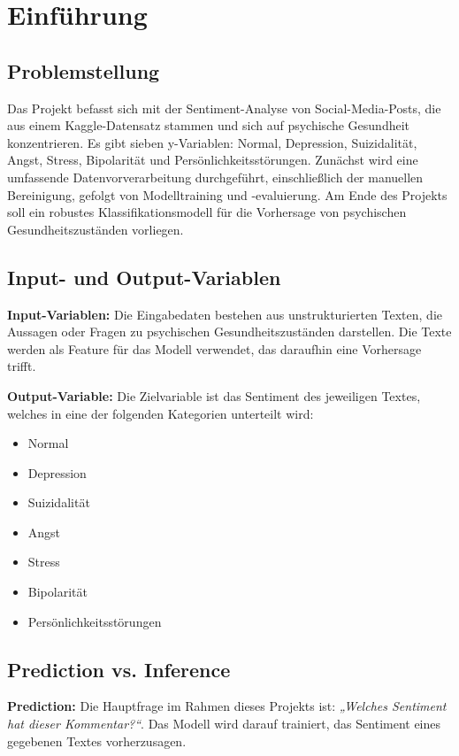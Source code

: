 \section{Einführung}

\subsection{Problemstellung}
Das Projekt befasst sich mit der Sentiment-Analyse von Social-Media-Posts, die aus einem Kaggle-Datensatz stammen und sich auf psychische Gesundheit konzentrieren. Es gibt sieben y-Variablen: Normal, Depression, Suizidalität, Angst, Stress, Bipolarität und Persönlichkeitsstörungen. Zunächst wird eine umfassende Datenvorverarbeitung durchgeführt, einschließlich der manuellen Bereinigung, gefolgt von Modelltraining und -evaluierung. Am Ende des Projekts soll ein robustes Klassifikationsmodell für die Vorhersage von psychischen Gesundheitszuständen vorliegen.

\subsection{Input- und Output-Variablen}
\textbf{Input-Variablen:} Die Eingabedaten bestehen aus unstrukturierten Texten, die Aussagen oder Fragen zu psychischen Gesundheitszuständen darstellen. Die Texte werden als Feature für das Modell verwendet, das daraufhin eine Vorhersage trifft.

\textbf{Output-Variable:} Die Zielvariable ist das Sentiment des jeweiligen Textes, welches in eine der folgenden Kategorien unterteilt wird:
\begin{itemize}
    \item Normal
    \item Depression
    \item Suizidalität
    \item Angst
    \item Stress
    \item Bipolarität
    \item Persönlichkeitsstörungen
\end{itemize}

\subsection{Prediction vs. Inference}
\textbf{Prediction:} Die Hauptfrage im Rahmen dieses Projekts ist: \textit{„Welches Sentiment hat dieser Kommentar?“}. Das Modell wird darauf trainiert, das Sentiment eines gegebenen Textes vorherzusagen.

